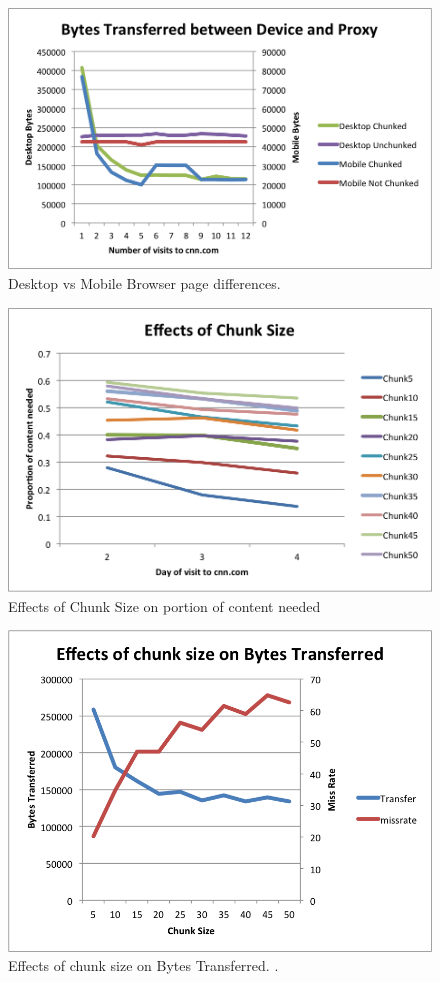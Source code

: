 \begin{figure}[h] 
\centering \includegraphics[width=\columnwidth]{images/desktopmobile.png}
\caption{Desktop vs Mobile Browser page differences.}
\end{figure}
\begin{figure}[h] 
\centering \includegraphics[width=\columnwidth]{images/chunksize.png}
\caption{Effects of Chunk Size on portion of content needed}
\end{figure}
\begin{figure}[h] 
\centering \includegraphics[width=\columnwidth]{images/chunksize2.png}
\caption{Effects of chunk size on Bytes Transferred. .}
\end{figure}
